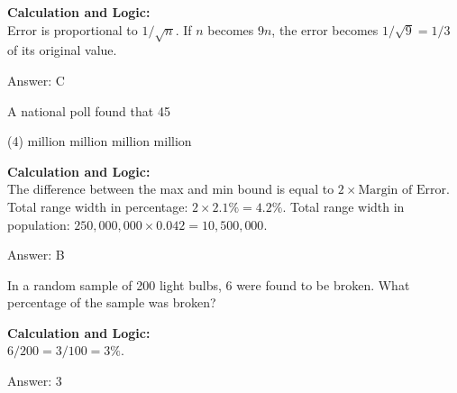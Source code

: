 \documentclass[11pt,paper=a4,answers]{exam}
\begin{document}
\begin{questions}
\begin{solution}
\textbf{Calculation and Logic:} \\
Error is proportional to $1/\sqrt{n}$. If $n$ becomes $9n$, the error becomes $1/\sqrt{9} = 1/3$ of its original value.

\vspace{30pt}

Answer: \colorbox{yellow!100}{C}
\end{solution}

\vspace{60pt}

\question
A national poll found that 45%
\begin{tasks}(4)
     million
     million
     million
     million
\end{tasks}

\begin{solution}
\textbf{Calculation and Logic:} \\
The difference between the max and min bound is equal to $2 \times \text{Margin of Error}$. Total range width in percentage: $2 \times 2.1\% = 4.2\%$. Total range width in population: $250,000,000 \times 0.042 = 10,500,000$.

\vspace{30pt}

Answer: \colorbox{yellow!100}{B}
\end{solution}

\vspace{60pt}

\question
In a random sample of 200 light bulbs, 6 were found to be broken. What percentage of the sample was broken?

\begin{solution}
\textbf{Calculation and Logic:} \\
$6 / 200 = 3 / 100 = 3\%$.

\vspace{30pt}

Answer: \colorbox{yellow!100}{3}
\end{solution}


\end{questions}
\end{document}
